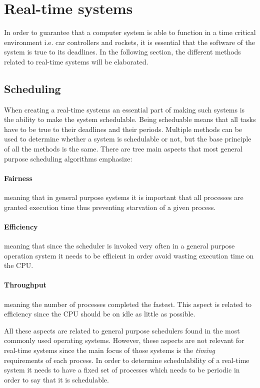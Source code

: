 \section{Real-time systems}
In order to guarantee that a computer system is able to function in a time critical environment i.e. car controllers and rockets, it is essential that the software of the system is true to its deadlines. 
In the following section, the different methods related to real-time systems will be elaborated.

\subsection{Scheduling}
When creating a real-time systems an essential part of making such systems is the ability to make the system schedulable.
Being scheduable means that all tasks have to be true to their deadlines and their periods. 
Multiple methods can be used to determine whether a system is schedulable or not, but the base principle of all the methods is the same. 
There are tree main aspects that most general purpose scheduling algorithms emphasize:
\paragraph{Fairness} meaning that in general purpose systems it is important that all processes are granted execution time thus preventing starvation of a given process. 
\paragraph{Efficiency} meaning that since the scheduler is invoked very often in a general purpose operation system it needs to be efficient in order avoid wasting execution time on the CPU. 
\paragraph{Throughput} meaning the number of processes completed the fastest.
This aspect is related to efficiency since the CPU should be on idle as little as possible. 

All these aspects are related to general purpose schedulers found in the most commonly used operating systems. 
However, these aspects are not relevant for real-time systems since the main focus of those systems is the \textit{timing} requirements of each process.
In order to determine schedulability of a real-time system it needs to have a fixed set of processes which needs to be periodic in order to say that it is schedulable.

